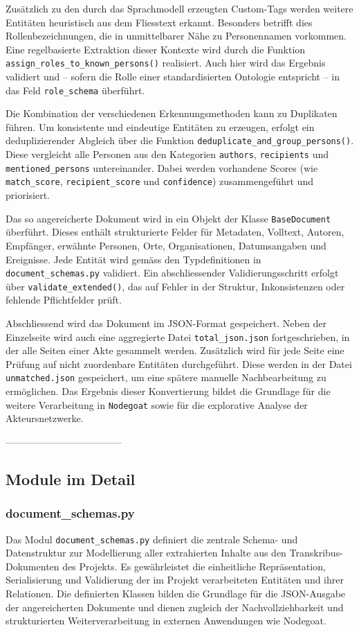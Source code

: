 \documentclass[12pt, a4paper, ngerman, bidi=default]{article}
\newcommand{\code}[1]{\colorbox{VeryLightGray}{\texttt{#1}}} %
\begin{document}
Zusätzlich zu den durch das Sprachmodell erzeugten Custom-Tags werden weitere Entitäten heuristisch aus dem Fliesstext erkannt. 
Besonders betrifft dies Rollenbezeichnungen, die in unmittelbarer Nähe zu Personennamen vorkommen. Eine regelbasierte Extraktion 
dieser Kontexte wird durch die Funktion \code{assign\_roles\_to\_known\_persons()} realisiert. Auch hier wird das Ergebnis validiert 
und – sofern die Rolle einer standardisierten Ontologie entspricht – in das Feld \code{role\_schema} überführt.

Die Kombination der verschiedenen Erkennungsmethoden kann zu Duplikaten führen. Um konsistente und eindeutige Entitäten zu erzeugen, 
erfolgt ein deduplizierender Abgleich über die Funktion \code{deduplicate\_and\_group\_persons()}. Diese vergleicht alle Personen 
aus den Kategorien \code{authors}, \code{recipients} und \code{mentioned\_persons} untereinander. Dabei werden vorhandene Scores 
(wie \code{match\_score}, \code{recipient\_score} und \code{confidence}) zusammengeführt und priorisiert.

Das so angereicherte Dokument wird in ein Objekt der Klasse \code{BaseDocument} überführt. Dieses enthält strukturierte Felder für 
Metadaten, Volltext, Autoren, Empfänger, erwähnte Personen, Orte, Organisationen, Datumsangaben und Ereignisse. Jede Entität wird gemäss 
den Typdefinitionen in \code{document\_schemas.py} validiert. Ein abschliessender Validierungsschritt erfolgt über 
\code{validate\_extended()}, das auf Fehler in der Struktur, Inkonsistenzen oder fehlende Pflichtfelder prüft.

Abschliessend wird das Dokument im JSON-Format gespeichert. Neben der Einzelseite wird auch eine aggregierte Datei 
\code{total\_json.json} fortgeschrieben, in der alle Seiten einer Akte gesammelt werden. Zusätzlich wird für jede Seite 
eine Prüfung auf nicht zuordenbare Entitäten durchgeführt. Diese werden in der Datei \code{unmatched.json} gespeichert, 
um eine spätere manuelle Nachbearbeitung zu ermöglichen. Das Ergebnis dieser Konvertierung bildet die Grundlage für die weitere 
Verarbeitung in \code{Nodegoat} sowie für die explorative Analyse der Akteursnetzwerke.

------------------------------------


\subsection{Module im Detail}\label{subsec:Module_im_Detail}
\subsubsection{document\_schemas.py}\label{subsec:document_schema}
Das Modul \code{document\_schemas.py} definiert die zentrale Schema- und Datenstruktur 
zur Modellierung aller extrahierten Inhalte aus den Transkribus-Dokumenten des Projekts. Es gewährleistet die einheitliche Repräsentation, 
Serialisierung und Validierung der im Projekt verarbeiteten Entitäten und ihrer Relationen. Die definierten Klassen bilden die Grundlage für die JSON-Ausgabe der angereicherten Dokumente und dienen zugleich der Nachvollziehbarkeit und strukturierten Weiterverarbeitung in externen Anwendungen wie Nodegoat.
\end{document}

